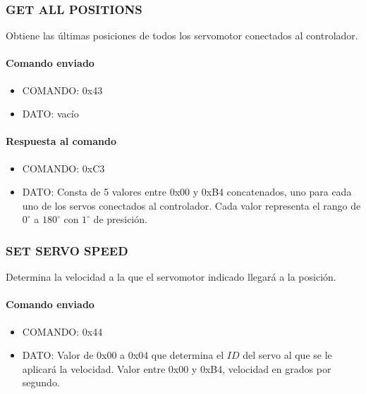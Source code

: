 \subsubsection{GET ALL POSITIONS}
\label{hA_protocolo_get_all_positions}

Obtiene las \'ultimas posiciones de todos los servomotor conectados al controlador.

\paragraph*{Comando enviado}

\begin{itemize}
	\item{COMANDO:} 0x43
	\item{DATO:} vac\'io
\end{itemize}

\paragraph*{Respuesta al comando}

\begin{itemize}
	\item{COMANDO:} 0xC3
	\item{DATO:} Consta de 5 valores entre 0x00 y 0xB4 concatenados, uno para cada uno de los servos conectados al controlador.
	Cada valor representa el rango de $0^{\circ}$ a $180^{\circ}$ con $1^{\circ}$ de presici\'on.
\end{itemize}

\subsubsection{SET SERVO SPEED}
\label{hA_protocolo_set_servo_speed}

Determina la velocidad a la que el servomotor indicado llegar\'a a la posici\'on.

\paragraph*{Comando enviado}

\begin{itemize}
	\item{COMANDO:} 0x44
	\item{DATO:} Valor de 0x00 a 0x04 que determina el $ID$ del servo al que se le aplicar\'a la velocidad.
	Valor entre 0x00 y 0xB4, velocidad en grados por segundo.
\end{itemize}

